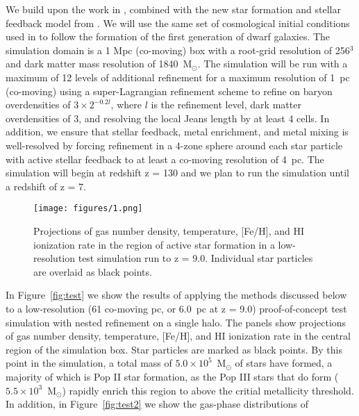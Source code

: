 \documentclass[12pt]{article} %
\begin{document}
We build upon the work in \citep{Wise2012a,WiseAbel2012,Wise2014,Corlies2018}, combined with the new star formation and stellar feedback model from \citep{Emerick2019a}. We will use the same set of cosmological initial conditions used in \citep{Wise2012a} to follow the formation of the first generation of dwarf galaxies. The simulation domain is a 1 Mpc (co-moving) box with a root-grid resolution of 256$^3$ and dark matter mass resolution of 1840~M$_{\odot}$. The simulation will be run with a maximum of 12 levels of additional refinement for a maximum resolution of 1~pc (co-moving) using a super-Lagrangian refinement scheme \citep{OsheaNorma2008} to refine on baryon overdensities of $3\times 2^{-0.2l}$, where $l$ is the refinement level, dark matter overdensities of 3, and resolving the local Jeans length by at least 4 cells. In addition, we ensure that stellar feedback, metal enrichment, and metal mixing is well-resolved by forcing refinement in a 4-zone sphere around each star particle with active stellar feedback to at least a co-moving resolution of 4~pc. The simulation will begin at redshift z = 130 and we plan to run the simulation until a redshift of z = 7.

\begin{figure*}
  \centering
  \texttt{[image: figures/1.png]}
  \caption{Projections of gas number density, temperature, [Fe/H], and HI ionization rate in the region of active star formation in a low-resolution test simulation run to z = 9.0. Individual star particles are overlaid as black points.}
  \label{fig:mixing}
\end{figure*}

In Figure~\ref{fig:test} we show the results of applying the methods discussed below to a low-resolution (61 co-moving pc, or 6.0~pc at z = 9.0) proof-of-concept test simulation with nested refinement on a single halo. The panels show projections of gas number density, temperature, [Fe/H], and HI ionization rate in the central region of the simulation box. Star particles are marked as black points. By this point in the simulation, a total mass  of $5.0 \times 10^{5}$~M$_{\odot}$ of stars have formed, a majority of which is Pop II star formation, as the Pop III stars that do form ($5.5 \times 10^{3}$~M$_{\odot}$) rapidly enrich this region to above the critial metallicity threshold. In addition, in Figure~\ref{fig:test2} we show the gas-phase distributions of

\end{document}
